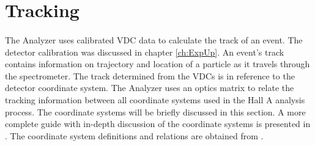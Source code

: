 \section{Tracking}
\paragraph{}The Analyzer uses calibrated VDC data to calculate the track of an event. The detector calibration was discussed in chapter \ref{ch:ExpUp}. An event's track contains information on trajectory and location of a particle as it travels through the spectrometer. The track determined from the VDCs is in reference to the detector coordinate system. The Analyzer uses an optics matrix to relate the tracking information between all coordinate systems used in the Hall A analysis process. The coordinate systems will be briefly discussed in this section. A more complete guide with in-depth discussion of the coordinate systems is presented in \cite{espace}. The coordinate system definitions and relations are obtained from \cite{espace,HallA,optics}.
